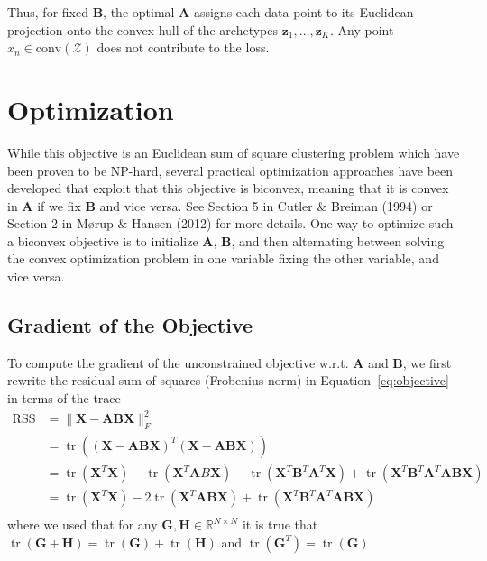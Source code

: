 \documentclass[oneside]{article}
\begin{document}
Thus, for fixed $\mathbf{B}$, the optimal $\mathbf{A}$ assigns each data point to its Euclidean projection onto the convex hull of the archetypes $\mathbf{z}_1, ..., \mathbf{z}_K$. Any point $x_n \in \text{conv}(\mathcal{Z})$ does not contribute to the loss.



\section{Optimization}

While this objective is an Euclidean sum of square clustering problem which have been proven to be NP-hard\autocite{aloiseNPhardnessEuclideanSumofsquares2009}, several practical optimization approaches have been developed that exploit that this objective is biconvex, meaning that it is convex in $\mathbf{A}$ if we fix $\mathbf{B}$ and vice versa. See Section 5 in Cutler \& Breiman (1994) \autocite{cutlerArchetypalAnalysis1994} or Section 2 in Mørup \& Hansen (2012) \autocite{morupArchetypalAnalysisMachine2012} for more details. One way to optimize such a biconvex objective is to initialize $\mathbf{A}$, $\mathbf{B}$, and then alternating between solving the convex optimization problem in one variable fixing the other variable, and vice versa.

\subsection{Gradient of the Objective}

To compute the gradient of the unconstrained objective w.r.t. $\mathbf{A}$ and $\mathbf{B}$, we first rewrite the residual sum of squares (Frobenius norm) in Equation~\eqref{eq:objective} in terms of the trace
\begin{equation}
\begin{aligned}
\operatorname{RSS} &= \| \mathbf{X} - \mathbf{A} \mathbf{B} \mathbf{X}\|_F^2 \\
&= \operatorname{tr} \left( \left( \mathbf{X} - \mathbf{A} \mathbf{B} \mathbf{X} \right)^T \left( \mathbf{X} - \mathbf{A} \mathbf{B} \mathbf{X} \right) \right) \\
&=  \operatorname{tr}(\mathbf{X}^T \mathbf{X}) - \operatorname{tr}(\mathbf{X}^T \mathbf{A} B \mathbf{X}) - \operatorname{tr}(\mathbf{X}^T \mathbf{B}^T \mathbf{A}^T \mathbf{X}) + \operatorname{tr}(\mathbf{X}^T \mathbf{B}^T \mathbf{A}^T \mathbf{A} \mathbf{B} \mathbf{X}) \\
&=  \operatorname{tr}(\mathbf{X}^T \mathbf{X}) - 2 \operatorname{tr}(\mathbf{X}^T \mathbf{A} \mathbf{B} \mathbf{X}) + \operatorname{tr}(\mathbf{X}^T \mathbf{B}^T \mathbf{A}^T \mathbf{A} \mathbf{B} \mathbf{X}) \\
\end{aligned}
\tag{5}
\end{equation}
where we used that for any $\mathbf{G}, \mathbf{H} \in \mathbb{R}^{N \times N}$ it is true that $\operatorname{tr}(\mathbf{G} + \mathbf{H}) = \operatorname{tr}(\mathbf{G})+\operatorname{tr}(\mathbf{H})$ and $\operatorname{tr}(\mathbf{G}^T)=\operatorname{tr}(\mathbf{G})$
\end{document}
